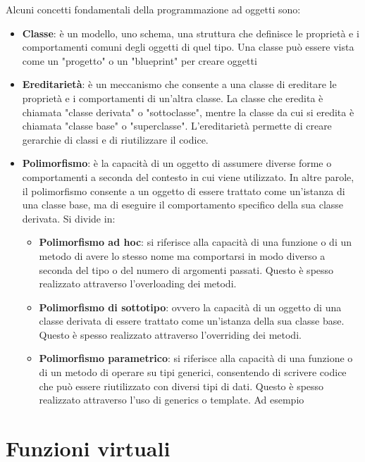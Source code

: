Alcuni concetti fondamentali della programmazione ad oggetti sono:
\begin{itemize}
    \item \textbf{Classe}: è un modello, uno schema, una struttura che definisce le proprietà e i comportamenti comuni degli oggetti di quel tipo. Una classe può essere vista come un "progetto" o un "blueprint" per creare oggetti
    \item \textbf{Ereditarietà}: è un meccanismo che consente a una classe di ereditare le proprietà e i comportamenti di un'altra classe. La classe che eredita è chiamata "classe derivata" o "sottoclasse", mentre la classe da cui si eredita è chiamata "classe base" o "superclasse". L'ereditarietà permette di creare gerarchie di classi e di riutilizzare il codice.
    \item \textbf{Polimorfismo}: è la capacità di un oggetto di assumere diverse forme o comportamenti a seconda del contesto in cui viene utilizzato. In altre parole, il polimorfismo consente a un oggetto di essere trattato come un'istanza di una classe base, ma di eseguire il comportamento specifico della sua classe derivata. Si divide in:
    \begin{itemize}
        \item \textbf{Polimorfismo ad hoc}: si riferisce alla capacità di una funzione o di un metodo di avere lo stesso nome ma comportarsi in modo diverso a seconda del tipo o del numero di argomenti passati. Questo è spesso realizzato attraverso l'overloading dei metodi.
        \item \textbf{Polimorfismo di sottotipo}: ovvero la capacità di un oggetto di una classe derivata di essere trattato come un'istanza della sua classe base. Questo è spesso realizzato attraverso l'overriding dei metodi.
        \item \textbf{Polimorfismo parametrico}: si riferisce alla capacità di una funzione o di un metodo di operare su tipi generici, consentendo di scrivere codice che può essere riutilizzato con diversi tipi di dati. Questo è spesso realizzato attraverso l'uso di generics o template. Ad esempio
    \end{itemize}
\end{itemize}
\section{Funzioni virtuali}


